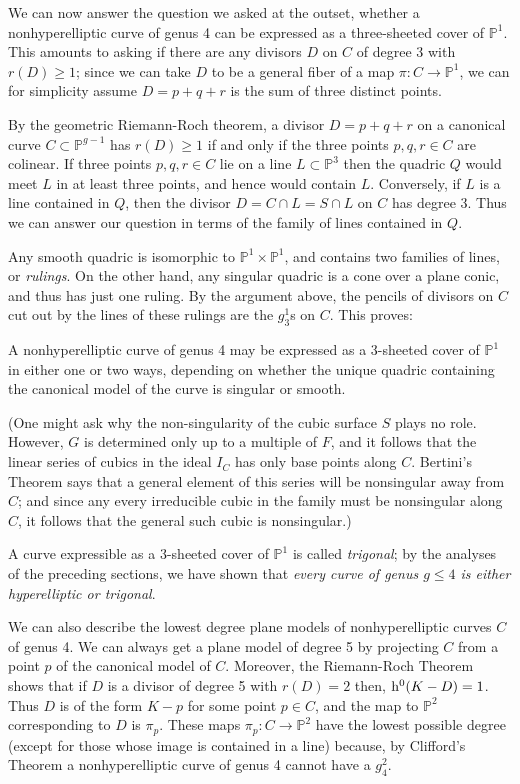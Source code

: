 \documentclass[12pt, leqno]{article}
\def\PP{{\mathbb P}}
\def\h{{\rm h}}
\begin{document}
We can now answer the question we asked at the outset, whether a nonhyperelliptic curve of genus 4 can be expressed as a three-sheeted cover of $\PP^1$. This amounts to asking if there are any divisors $D$ on $C$ of degree 3 with $r(D) \geq 1$; since we can take $D$ to be a general fiber of a map $\pi : C \to \PP^1$, we can for simplicity assume $D = p+q+r$ is the sum of three distinct points.

By the geometric Riemann-Roch theorem, a divisor $D = p+q+r$ on a canonical curve $C \subset \PP^{g-1}$ has $r(D) \geq 1$ if and only if the three points $p,q,r \in C$ are colinear. If three points $p,q,r \in C$ lie on a line $L \subset \PP^3$ then the quadric $Q$ would meet $L$ in at least three points, and hence would contain $L$. Conversely,  if $L$ is a line contained in $Q$, then the divisor $D = C \cap L = S \cap L$ on $C$ has degree  3. Thus we can answer our question in terms of the family of lines contained in $Q$.

Any smooth quadric is isomorphic to $\PP^1\times \PP^1$, and contains two families of lines, or \emph{rulings}. On the other hand, any singular quadric is a cone over a plane conic, and thus has just one ruling. By the argument above, the pencils of divisors on $C$ cut out by the lines of these rulings are the $g^1_3$s on $C$. This proves:

\begin{proposition}\label{genus 4 trigonal}
A nonhyperelliptic curve of genus 4 may be expressed as a 3-sheeted cover of $\PP^1$ in either one or two ways, depending on whether the unique quadric containing the canonical model of the curve is singular or smooth.
\end{proposition}

 (One might ask why the non-singularity of the cubic surface $S$ plays no role. However, $G$ is determined only up to a multiple of $F$, and it follows that the linear series of cubics in the ideal
$I_C$ has only base points along $C$. Bertini's Theorem says that a general element of this series will be nonsingular away from $C$; and since any every irreducible cubic in the family must be nonsingular along $C$, it follows that the general such cubic is nonsingular.)

A curve expressible as a 3-sheeted cover of $\PP^1$ is called \emph{trigonal}; by the analyses of the preceding sections, we have shown that \emph{every curve of genus $g \leq 4$ is either hyperelliptic or trigonal}. 

We can also describe the lowest degree plane models of nonhyperelliptic curves $C$ of genus 4. 
We can always get a plane model of degree 5 by projecting $C$ from a point $p$ of the canonical model of $C$. Moreover, the Riemann-Roch Theorem shows that if $D$ is a divisor of degree 5 with $r(D)=2$ then,  $\h^0(K-D) = 1$. Thus $D$ is of the form $K-p$ for some point $p \in C$, and the map to $\PP^2$ corresponding to $D$ is $\pi_p$. These  maps $\pi_p: C\to \PP^2$ have the lowest possible degree (except for those whose image is  contained in a line) because, by Clifford's Theorem a nonhyperelliptic curve of genus 4 cannot have a $g^2_4$.
\end{document}
